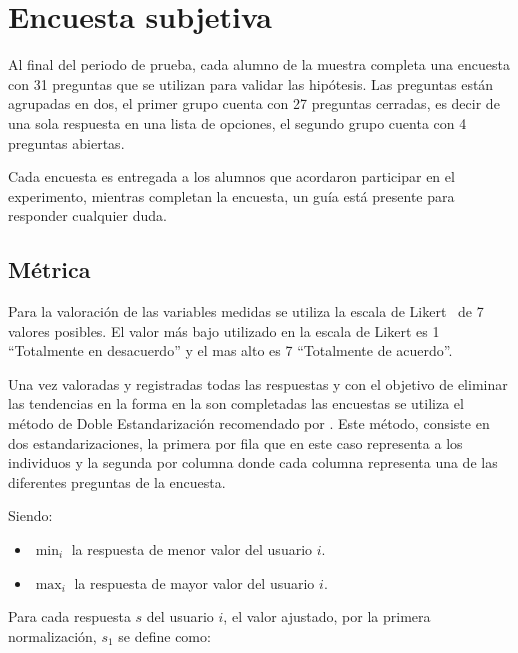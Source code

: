\section{Encuesta subjetiva}

Al final del periodo de prueba, cada alumno de la muestra completa una encuesta
con 31 preguntas que se utilizan para validar las hipótesis. Las preguntas están
agrupadas en dos, el primer grupo cuenta con 27 preguntas cerradas, es decir de
una sola respuesta en una lista de opciones, el segundo grupo cuenta con 4
preguntas abiertas. 

Cada encuesta es entregada a los alumnos que acordaron participar en el
experimento, mientras completan la encuesta, un guía está presente para
responder cualquier duda.

\subsection{Métrica}
\label{sec:metrica}
\label{sec:likert}


Para la valoración de las variables medidas se utiliza la escala de
Likert~\cite{Allen:2007} de 7 valores posibles. El valor más bajo utilizado en
la escala de Likert es 1 ``Totalmente en desacuerdo'' y el mas alto es 7
``Totalmente de acuerdo''.

Una vez valoradas y registradas todas las respuestas y con el objetivo de
eliminar las tendencias en la forma en la son completadas las encuestas
\cite{Fischer2010} se utiliza el método de Doble Estandarización recomendado por
\cite{Pagolu2011}. Este método, consiste en dos estandarizaciones, la primera
por fila que en este caso representa a los individuos y la segunda por columna
donde cada columna representa una de las diferentes preguntas de la encuesta.

Siendo:
\begin{itemize}
	\item $\min_i$ la respuesta de menor valor del usuario $i$.
	\item $\max_i$ la respuesta de mayor valor del usuario $i$.
\end{itemize}

Para cada respuesta $s$ del usuario $i$, el valor ajustado, por la primera 
normalización, $s_1$ se define como:

